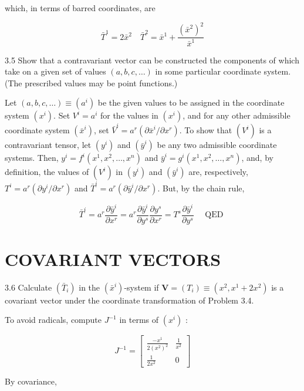 \documentclass[10pt]{article}
\begin{document}
which, in terms of barred coordinates, are

$$
\bar{T}^{1}=2 \bar{x}^{2} \quad \bar{T}^{2}=\bar{x}^{1}+\frac{\left(\bar{x}^{2}\right)^{2}}{\bar{x}^{1}}
$$

3.5 Show that a contravariant vector can be constructed the components of which take on a given set of values $(a, b, c, \ldots)$ in some particular coordinate system. (The prescribed values may be point functions.)

Let $(a, b, c, \ldots) \equiv\left(a^{i}\right)$ be the given values to be assigned in the coordinate system $\left(x^{i}\right)$. Set $V^{i}=a^{i}$ for the values in $\left(x^{i}\right)$, and for any other admissible coordinate system $\left(\bar{x}^{i}\right)$, set $\bar{V}^{i}=a^{r}\left(\partial \bar{x}^{i} / \partial x^{r}\right)$. To show that $\left(V^{i}\right)$ is a contravariant tensor, let $\left(y^{i}\right)$ and $\left(\bar{y}^{i}\right)$ be any two admissible coordinate systems. Then, $y^{i}=f^{i}\left(x^{1}, x^{2}, \ldots, x^{n}\right)$ and $\bar{y}^{i}=g^{i}\left(x^{1}, x^{2}, \ldots, x^{n}\right)$, and, by definition, the values of $\left(V^{i}\right)$ in $\left(y^{i}\right)$ and $\left(\bar{y}^{i}\right)$ are, respectively, $T^{i}=a^{r}\left(\partial y^{i} / \partial x^{r}\right)$ and $\bar{T}^{i}=a^{r}\left(\partial \bar{y}^{i} / \partial x^{r}\right)$. But, by the chain rule,

$$
\bar{T}^{i}=a^{r} \frac{\partial \bar{y}^{i}}{\partial x^{r}}=a^{r} \frac{\partial \bar{y}^{i}}{\partial y^{s}} \frac{\partial y^{s}}{\partial x^{r}}=T^{s} \frac{\partial \bar{y}^{i}}{\partial y^{s}} \quad \text { QED }
$$

\section*{COVARIANT VECTORS}
3.6 Calculate $\left(\bar{T}_{i}\right)$ in the $\left(\bar{x}^{i}\right)$-system if $\mathbf{V}=\left(T_{i}\right) \equiv\left(x^{2}, x^{1}+2 x^{2}\right)$ is a covariant vector under the coordinate transformation of Problem 3.4.

To avoid radicals, compute $J^{-1}$ in terms of $\left(x^{i}\right)$ :

$$
J^{-1}=\left[\begin{array}{cc}
\frac{-x^{1}}{2\left(x^{2}\right)^{2}} & \frac{1}{x^{2}} \\
\frac{1}{2 x^{2}} & 0
\end{array}\right]
$$

By covariance,
\end{document}

